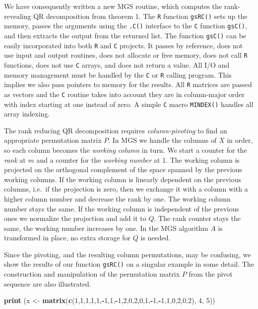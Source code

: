 \documentclass[12pt,]{article}
\newenvironment{Shaded}{\begin{snugshade}}{\end{snugshade}}
\newcommand{\KeywordTok}[1]{\textcolor[rgb]{0.13,0.29,0.53}{\textbf{#1}}}
\newcommand{\DecValTok}[1]{\textcolor[rgb]{0.00,0.00,0.81}{#1}}
\newcommand{\StringTok}[1]{\textcolor[rgb]{0.31,0.60,0.02}{#1}}
\newcommand{\OperatorTok}[1]{\textcolor[rgb]{0.81,0.36,0.00}{\textbf{#1}}}
\newcommand{\NormalTok}[1]{#1}
\begin{document}
We have consequently written a new MGS routine, which computes the
rank-revealing QR decomposition from theorem 1. The \texttt{R} function
\texttt{gsRC()} sets up the memory, passes the arguments using the
\texttt{.C()} interface to the \texttt{C} function \texttt{gsC()}, and
then extracts the output from the returned list. The function
\texttt{gsC()} can be easily incorporated into both \texttt{R} and
\texttt{C} projects. It passes by reference, does not use input and
output routines, does not allocate or free memory, does not call
\texttt{R} functions, does not use \texttt{C} arrays, and does not
return a value. All I/O and memory management must be handled by the
\texttt{C} or \texttt{R} calling program. This implies we also pass
pointers to memory for the results. All \texttt{R} matrices are passed
as vectors and the \texttt{C} routine takes into account they are in
column-major order with index starting at one instead of zero. A simple
\texttt{C} macro \texttt{MINDEX()} handles all array indexing.

The rank reducing QR decomposition requires \emph{column-pivoting} to
find an appropriate permutation matrix \(P\). In MGS we handle the
columns of \(X\) in order, so each column becomes the \emph{working
column} in turn. We start a counter for the \emph{rank} at \(m\) and a
counter for the \emph{working number} at 1. The working column is
projected on the orthogonal complement of the space spanned by the
previous working columns. If the working column is linearly dependent on
the previous columns, i.e.~if the projection is zero, then we exchange
it with a column with a higher column number and decrease the rank by
one. The working column number stays the same. If the working column is
independent of the previous ones we normalize the projection and add it
to \(Q\). The rank counter stays the same, the working number increases
by one. In the MGS algorithm \(A\) is transformed in place, no extra
storage for \(Q\) is needed.

Since the pivoting, and the resulting column permutations, may be
confusing, we show the results of our function \texttt{gsRC()} on a
singular example in some detail. The construction and manipulation of
the permutation matrix \(P\) from the pivot sequence are also
illustrated.

\begin{Shaded}
\begin{Highlighting}[]
\KeywordTok{print}\NormalTok{ (x <-}\StringTok{ }\KeywordTok{matrix}\NormalTok{(}\KeywordTok{c}\NormalTok{(}\DecValTok{1}\NormalTok{,}\DecValTok{1}\NormalTok{,}\DecValTok{1}\NormalTok{,}\DecValTok{1}\NormalTok{,}\DecValTok{1}\NormalTok{,}\OperatorTok{-}\DecValTok{1}\NormalTok{,}\DecValTok{1}\NormalTok{,}\OperatorTok{-}\DecValTok{1}\NormalTok{,}\DecValTok{2}\NormalTok{,}\DecValTok{0}\NormalTok{,}\DecValTok{2}\NormalTok{,}\DecValTok{0}\NormalTok{,}\DecValTok{1}\NormalTok{,}\OperatorTok{-}\DecValTok{1}\NormalTok{,}\OperatorTok{-}\DecValTok{1}\NormalTok{,}\DecValTok{1}\NormalTok{,}\DecValTok{0}\NormalTok{,}\DecValTok{2}\NormalTok{,}\DecValTok{0}\NormalTok{,}\DecValTok{2}\NormalTok{), }\DecValTok{4}\NormalTok{, }\DecValTok{5}\NormalTok{))}
\end{Highlighting}
\end{Shaded}
\end{document}
